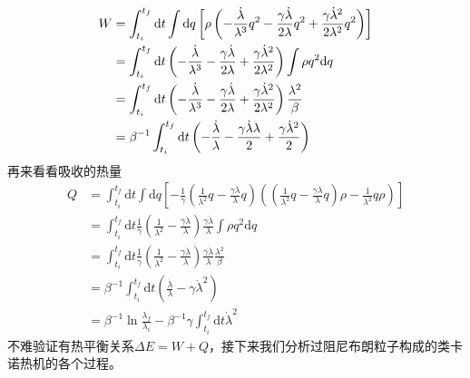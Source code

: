 \begin{equation}
    \begin{split}
        W &=\int_{t_{i}}^{t_{f}} \mathrm{d} t \int \mathrm{d} q \left[\rho \left(- \frac{\dot{\lambda}}{\lambda^3} q^2 -\frac{\gamma \dot{\lambda}}{2 \lambda} q^2 +  \frac{\gamma \dot{\lambda}^2}{2 \lambda^2} q^2 \right) \right]\\
        &=\int_{t_{i}}^{t_{f}} \mathrm{d} t  \left(- \frac{\dot{\lambda}}{\lambda^3} -\frac{\gamma \dot{\lambda}}{2 \lambda} +  \frac{\gamma \dot{\lambda}^2}{2 \lambda^2} \right)\int \rho q^2 \mathrm{d}   q\\
        &=\int_{t_{i}}^{t_{f}} \mathrm{d} t  \left(- \frac{\dot{\lambda}}{\lambda^3} -\frac{\gamma \dot{\lambda}}{2 \lambda} +  \frac{\gamma \dot{\lambda}^2}{2 \lambda^2} \right)\frac{\lambda^2}{\beta}\\
        &=\beta^{-1} \int_{t_{i}}^{t_{f}} \mathrm{d} t  \left( -\frac{\dot{\lambda}}{\lambda} -\frac{\gamma \dot{\lambda} \lambda }{2} +  \frac{\gamma \dot{\lambda}^2}{2} \right)
    \end{split}
    \label{eq3.14}
\end{equation}
再来看看吸收的热量
\begin{equation}
    \begin{split}
        Q &=\int_{t_i}^{t_f} \mathrm{d} t \int \mathrm{d} q \left[-\frac{1}{\gamma}  \left( \frac{1}{ \lambda^2}q  -\frac{\gamma \dot{\lambda}}{ \lambda} q \right) \left(\left( \frac{1}{ \lambda^2}q  -\frac{\gamma \dot{\lambda}}{ \lambda} q \right) \rho-\frac{1}{\lambda^2}q \rho \right) \right ]\\
        &=\int_{t_i}^{t_f} \mathrm{d} t \frac{1}{\gamma}  \left( \frac{1}{ \lambda^2}  -\frac{\gamma \dot{\lambda}}{ \lambda} \right) \frac{\gamma \dot{\lambda}}{ \lambda} \int \rho q^2 \mathrm{d} q\\
        &=\int_{t_i}^{t_f} \mathrm{d} t \frac{1}{\gamma}  \left( \frac{1}{ \lambda^2}  -\frac{\gamma \dot{\lambda}}{ \lambda} \right) \frac{\gamma \dot{\lambda}}{ \lambda} \frac{\lambda^2}{\beta}\\ 
        &=\beta^{-1} \int_{t_i}^{t_f} \mathrm{d} t \left( \frac{\dot{\lambda}}{ \lambda}  -\gamma \dot{\lambda}^2 \right)\\
        &=\beta^{-1} \ln{\frac{\lambda_f}{\lambda_i}} - \beta^{-1} \gamma \int_{t_i}^{t_f} \mathrm{d} t    \dot{\lambda}^2 
    \end{split}
    \label{eq3.15}
\end{equation}
不难验证有热平衡关系$\Delta E = W + Q$，接下来我们分析过阻尼布朗粒子构成的类卡诺热机的各个过程。

